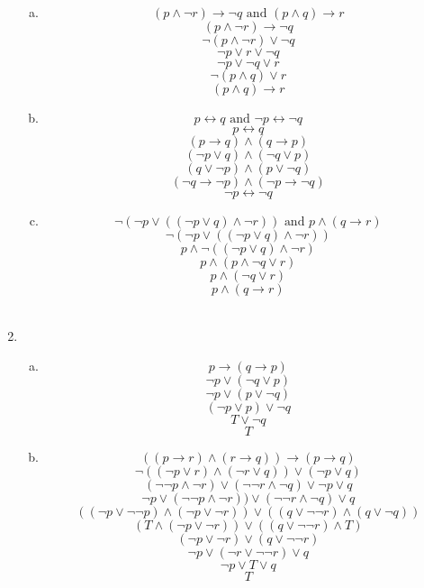 \documentclass[14pt]{extarticle} %
\begin{document}
\begin{enumerate}
\begin{enumerate}[a.]
        \item 
        \[(p \land \neg r) \rightarrow \neg q \text{ and } (p \land q) \rightarrow r\]
        \[(p \land \neg r) \rightarrow \neg q\]
        \[\neg (p \land \neg r) \lor \neg q\]
        \[\neg p \lor r \lor \neg q\]
        \[\neg p \lor \neg q \lor r\]
        \[\neg (p \land q) \lor r\]
        \[(p \land q) \rightarrow r\]
        
        \item
        \[p \leftrightarrow q \text{ and } \neg p \leftrightarrow \neg q\]
        \[p \leftrightarrow q\]
        \[(p \rightarrow q) \land (q \rightarrow p)\]
        \[(\neg p \lor q) \land (\neg q \lor p)\]
        \[(q \lor \neg p) \land (p \lor \neg q)\]
        \[ (\neg q \rightarrow \neg p) \land (\neg p \rightarrow \neg q)\]
        \[\neg p \leftrightarrow \neg q\]

        \item 
        \[\neg (\neg p \lor ((\neg p \lor q) \land \neg r)) \text{ and } p \land (q \rightarrow r)\]   
        \[\neg (\neg p \lor ((\neg p \lor q) \land \neg r))\]
        \[p \land \neg ((\neg p \lor q) \land \neg r)\]
        \[p \land (p \land \neg q \lor r)\]
        \[p \land (\neg q \lor r)\]
        \[p \land (q \rightarrow r)\] \\
    \end{enumerate}

    \item
    \begin{enumerate}[a.]
        \item 
        \[p \rightarrow (q \rightarrow p)\]
        \[\neg p \lor (\neg q \lor p)\]
        \[\neg p \lor (p \lor \neg q)\]
        \[(\neg p \lor p) \lor \neg q\]
        \[T \lor \neg q\]
        \[T\]
        
        \item 
        \[((p \rightarrow r) \land (r \rightarrow q)) \rightarrow (p \rightarrow q)\]
        \[\neg ((\neg p \lor r) \land (\neg r \lor q)) \lor (\neg p \lor q)\]
        \[(\neg \neg p \land \neg r) \lor (\neg \neg r \land \neg q) \lor \neg p \lor q\]
        \[\neg p \lor (\neg \neg p \land \neg r)) \lor (\neg \neg r \land \neg q) \lor q\]
        \[((\neg p \lor \neg \neg p) \land (\neg p \lor \neg r)) \lor ((q \lor \neg \neg r) \land (q \lor \neg q))\]
        \[(T \land (\neg p \lor \neg r)) \lor ((q \lor \neg \neg r) \land T)\]
        \[(\neg p \lor \neg r) \lor (q \lor \neg \neg r)\]
        \[\neg p \lor (\neg r \lor \neg \neg r) \lor q\]
        \[\neg p \lor T \lor q\]
        \[T\]
    \end{enumerate}


\end{enumerate}
\end{document}
